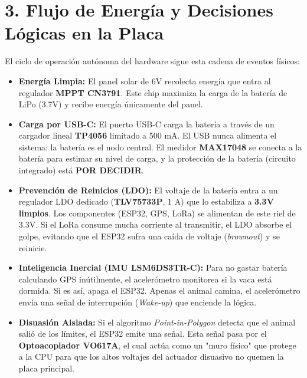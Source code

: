 \documentclass[10pt,letterpaper]{article}
\begin{document}
\section*{3. Flujo de Energía y Decisiones Lógicas en la Placa}
El ciclo de operación autónoma del hardware sigue esta cadena de eventos físicos:
\begin{itemize}[leftmargin=*]
    \item \textbf{Energía Limpia:} El panel solar de 6V recolecta energía que entra al regulador \textbf{MPPT CN3791}. Este chip maximiza la carga de la batería de LiPo (3.7V) y recibe energía únicamente del panel.
    \item \textbf{Carga por USB-C:} El puerto USB-C carga la batería a través de un cargador lineal \textbf{TP4056} limitado a 500 mA. El USB nunca alimenta el sistema: la batería es el nodo central. El medidor \textbf{MAX17048} se conecta a la batería para estimar su nivel de carga, y la protección de la batería (circuito integrado) está \textbf{POR DECIDIR}.
    \item \textbf{Prevención de Reinicios (LDO):} El voltaje de la batería entra a un regulador LDO dedicado (\textbf{TLV75733P}, 1 A) que lo estabiliza a \textbf{3.3V limpios}. Los componentes (ESP32, GPS, LoRa) se alimentan de este riel de 3.3V. Si el LoRa consume mucha corriente al transmitir, el LDO absorbe el golpe, evitando que el ESP32 sufra una caída de voltaje (\emph{brownout}) y se reinicie.
    \item \textbf{Inteligencia Inercial (IMU LSM6DS3TR-C):} Para no gastar batería calculando GPS inútilmente, el acelerómetro monitorea si la vaca está dormida. Si es así, apaga el ESP32. Apenas el animal camina, el acelerómetro envía una señal de interrupción (\emph{Wake-up}) que enciende la lógica.
    \item \textbf{Disuasión Aislada:} Si el algoritmo \emph{Point-in-Polygon} detecta que el animal salió de los límites, el ESP32 emite una señal. Esta señal pasa por el \textbf{Optoacoplador VO617A}, el cual actúa como un "muro físico" que protege a la CPU para que los altos voltajes del actuador disuasivo no quemen la placa principal.
\end{itemize}
\end{document}
